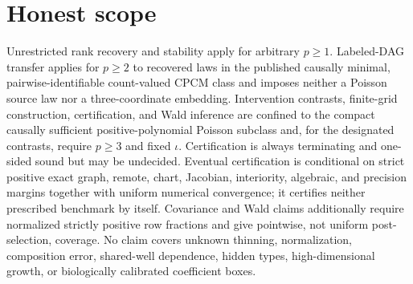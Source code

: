 \documentclass{article}
\begin{document}
\section{Honest scope}

Unrestricted rank recovery and stability apply for arbitrary \(p\geq1\). Labeled-DAG transfer applies for \(p\geq2\) to recovered laws in the published causally minimal, pairwise-identifiable count-valued CPCM class and imposes neither a Poisson source law nor a three-coordinate embedding. Intervention contrasts, finite-grid construction, certification, and Wald inference are confined to the compact causally sufficient positive-polynomial Poisson subclass and, for the designated contrasts, require \(p\geq3\) and fixed \(\iota\). Certification is always terminating and one-sided sound but may be undecided. Eventual certification is conditional on strict positive exact graph, remote, chart, Jacobian, interiority, algebraic, and precision margins together with uniform numerical convergence; it certifies neither prescribed benchmark by itself. Covariance and Wald claims additionally require normalized strictly positive row fractions and give pointwise, not uniform post-selection, coverage. No claim covers unknown thinning, normalization, composition error, shared-well dependence, hidden types, high-dimensional growth, or biologically calibrated coefficient boxes.
\end{document}
